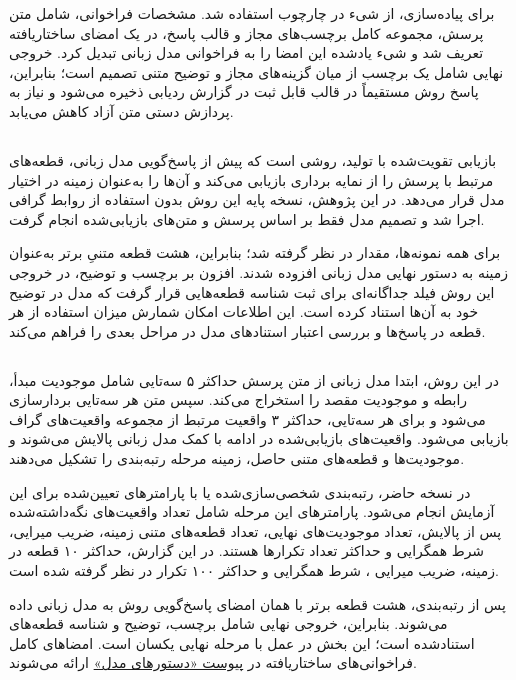 برای پیاده‌سازی، از شیء  در چارچوب  استفاده شد. مشخصات فراخوانی، شامل متن پرسش، مجموعه کامل برچسب‌های مجاز و قالب پاسخ، در یک امضای ساختاریافته تعریف شد و شیء یادشده این امضا را به فراخوانی مدل زبانی تبدیل کرد. خروجی نهایی شامل یک برچسب از میان گزینه‌های مجاز و توضیح متنی تصمیم است؛ بنابراین، پاسخ روش مستقیماً در قالب قابل ثبت در گزارش ردیابی ذخیره می‌شود و نیاز به پردازش دستی متن آزاد کاهش می‌یابد.

\subsection{}

بازیابی تقویت‌شده با تولید، روشی است که پیش از پاسخ‌گویی مدل زبانی، قطعه‌های مرتبط با پرسش را از نمایه برداری بازیابی می‌کند و آن‌ها را به‌عنوان زمینه در اختیار مدل قرار می‌دهد. در این پژوهش، نسخه پایه این روش بدون استفاده از روابط گرافی اجرا شد و تصمیم مدل فقط بر اساس پرسش و متن‌های بازیابی‌شده انجام گرفت.

برای همه نمونه‌ها، مقدار  در نظر گرفته شد؛ بنابراین، هشت قطعه متنیِ برتر به‌عنوان زمینه به دستور نهایی مدل زبانی افزوده شدند. افزون بر برچسب و توضیح، در خروجی این روش فیلد جداگانه‌ای برای ثبت شناسه قطعه‌هایی قرار گرفت که مدل در توضیح خود به آن‌ها استناد کرده است. این اطلاعات امکان شمارش میزان استفاده از هر قطعه در پاسخ‌ها و بررسی اعتبار استنادهای مدل در مراحل بعدی را فراهم می‌کند.

\subsection{}

در این روش، ابتدا مدل زبانی از متن پرسش حداکثر ۵ سه‌تایی شامل موجودیت مبدأ، رابطه و موجودیت مقصد را استخراج می‌کند. سپس متن هر سه‌تایی بردارسازی می‌شود و برای هر سه‌تایی، حداکثر ۳ واقعیت مرتبط از مجموعه واقعیت‌های گراف بازیابی می‌شود. واقعیت‌های بازیابی‌شده در ادامه با کمک مدل زبانی پالایش می‌شوند و موجودیت‌ها و قطعه‌های متنی حاصل، زمینه مرحله رتبه‌بندی را تشکیل می‌دهند.

در نسخه حاضر، رتبه‌بندی شخصی‌سازی‌شده یا  با پارامترهای تعیین‌شده برای این آزمایش انجام می‌شود. پارامترهای این مرحله شامل تعداد واقعیت‌های نگه‌داشته‌شده پس از پالایش، تعداد موجودیت‌های نهایی، تعداد قطعه‌های متنی زمینه، ضریب میرایی، شرط همگرایی و حداکثر تعداد تکرارها هستند. در این گزارش، حداکثر ۱۰ قطعه در زمینه، ضریب میرایی ، شرط همگرایی  و حداکثر ۱۰۰ تکرار در نظر گرفته شده است.

پس از رتبه‌بندی، هشت قطعه برتر با همان امضای پاسخ‌گویی روش  به مدل زبانی داده می‌شوند. بنابراین، خروجی نهایی شامل برچسب، توضیح و شناسه قطعه‌های استنادشده است؛ این بخش در عمل با مرحله نهایی  یکسان است. امضاهای کامل فراخوانی‌های ساختاریافته در \hyperref[app:prompts]{پیوست «دستورهای مدل»} ارائه می‌شوند.

